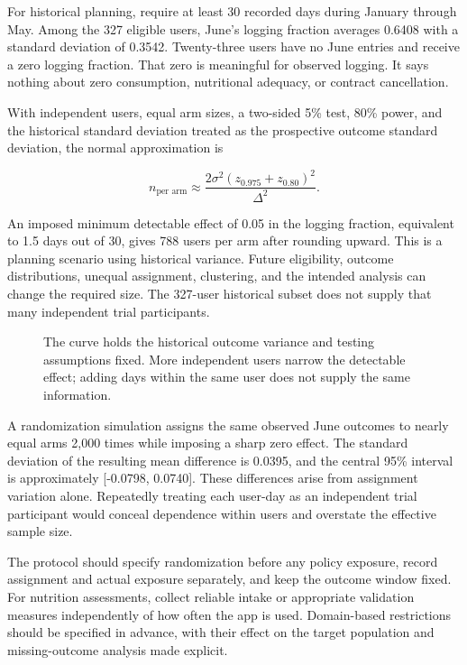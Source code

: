 For historical planning, require at least 30 recorded days during
January through May. Among the 327 eligible users, June's logging
fraction averages 0.6408 with a standard deviation of 0.3542.
Twenty-three users have no June entries and receive a zero logging
fraction. That zero is meaningful for observed logging. It says nothing
about zero consumption, nutritional adequacy, or contract cancellation.

With independent users, equal arm sizes, a two-sided 5\% test, 80\%
power, and the historical standard deviation treated as the prospective
outcome standard deviation, the normal approximation is

\[
n_{\text{per arm}}\approx
\frac{2\sigma^2(z_{0.975}+z_{0.80})^2}{\Delta^2}.
\]

An imposed minimum detectable effect of 0.05 in the logging fraction,
equivalent to 1.5 days out of 30, gives 788 users per arm after rounding
upward. This is a planning scenario using historical variance. Future
eligibility, outcome distributions, unequal assignment, clustering, and
the intended analysis can change the required size. The 327-user
historical subset does not supply that many independent trial
participants.

\begin{figure}[htbp]
\centering

\caption{The curve holds the historical outcome variance and testing assumptions fixed. More independent users narrow the detectable effect; adding days within the same user does not supply the same information.}\label{fig:M06_mhealth_precision}
\end{figure}

A randomization simulation assigns the same observed June outcomes to
nearly equal arms 2,000 times while imposing a sharp zero effect. The
standard deviation of the resulting mean difference is 0.0395, and the
central 95\% interval is approximately {[}-0.0798, 0.0740{]}. These
differences arise from assignment variation alone. Repeatedly treating
each user-day as an independent trial participant would conceal
dependence within users and overstate the effective sample size.

The protocol should specify randomization before any policy exposure,
record assignment and actual exposure separately, and keep the outcome
window fixed. For nutrition assessments, collect reliable intake or
appropriate validation measures independently of how often the app is
used. Domain-based restrictions should be specified in advance, with
their effect on the target population and missing-outcome analysis made
explicit.

